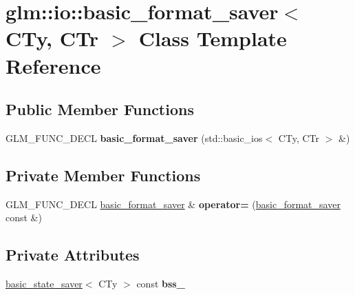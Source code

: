 \hypertarget{classglm_1_1io_1_1basic__format__saver}{}\section{glm\+:\+:io\+:\+:basic\+\_\+format\+\_\+saver$<$ C\+Ty, C\+Tr $>$ Class Template Reference}
\label{classglm_1_1io_1_1basic__format__saver}
\subsection*{Public Member Functions}
\begin{DoxyCompactItemize}
\item 
\mbox{\label{classglm_1_1io_1_1basic__format__saver_a9688fa6dce0c32285527df2336ca9127}} 
G\+L\+M\+\_\+\+F\+U\+N\+C\+\_\+\+D\+E\+CL {\bfseries basic\+\_\+format\+\_\+saver} (std\+::basic\+\_\+ios$<$ C\+Ty, C\+Tr $>$ \&)
\end{DoxyCompactItemize}
\subsection*{Private Member Functions}
\begin{DoxyCompactItemize}
\item 
\mbox{\label{classglm_1_1io_1_1basic__format__saver_a3d4f0a9fd357a611f81b17443cf5276b}} 
G\+L\+M\+\_\+\+F\+U\+N\+C\+\_\+\+D\+E\+CL \hyperlink{classglm_1_1io_1_1basic__format__saver}{basic\+\_\+format\+\_\+saver} \& {\bfseries operator=} (\hyperlink{classglm_1_1io_1_1basic__format__saver}{basic\+\_\+format\+\_\+saver} const \&)
\end{DoxyCompactItemize}
\subsection*{Private Attributes}
\begin{DoxyCompactItemize}
\item 
\mbox{\label{classglm_1_1io_1_1basic__format__saver_a5d2b333a0879f294698c266fa4a7792b}} 
\hyperlink{classglm_1_1io_1_1basic__state__saver}{basic\+\_\+state\+\_\+saver}$<$ C\+Ty $>$ const {\bfseries bss\+\_\+}
\end{DoxyCompactItemize}


